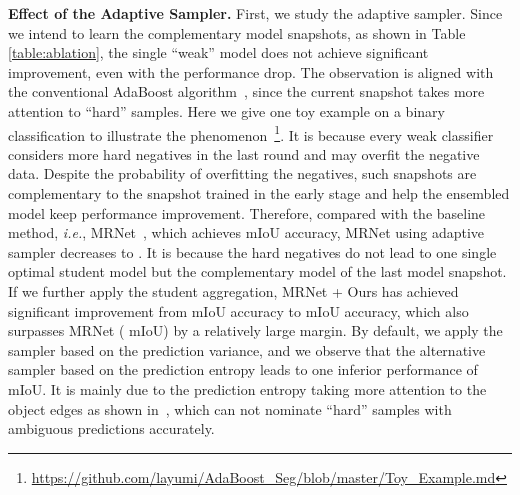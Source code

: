 \documentclass[journal]{IEEEtran}
\def\ie{\emph{i.e.}}
\begin{document}
\noindent\textbf{Effect of the Adaptive Sampler.}
First, we study the adaptive sampler. Since we intend to learn the complementary model snapshots, as shown in Table \ref{table:ablation}, the single ``weak'' model does not achieve significant improvement, even with the performance drop. The observation is aligned with the conventional AdaBoost algorithm~\cite{freund1996experiments}, since the current snapshot takes more attention to ``hard'' samples. Here we give one toy example on a binary classification to illustrate the phenomenon~\footnote{\url{https://github.com/layumi/AdaBoost_Seg/blob/master/Toy_Example.md}}.  It is because every weak classifier considers more hard negatives in the last round and may overfit the negative data. Despite the probability of overfitting the negatives, such snapshots are complementary to the snapshot trained in the early stage and help the ensembled model keep performance improvement. Therefore, compared with the baseline method, \ie, MRNet~\cite{zheng2019unsupervised}, which achieves  mIoU accuracy, MRNet using adaptive sampler decreases to . It is because the hard negatives do not lead to one single optimal student model but the complementary model of the last model snapshot. If we further apply the student aggregation, MRNet + Ours has achieved significant improvement from  mIoU accuracy to  mIoU accuracy, which also surpasses MRNet ( mIoU) by a relatively large margin. By default, we apply the sampler based on the prediction variance, and we observe that the alternative sampler based on the prediction entropy leads to one inferior performance of  mIoU. It is mainly due to the prediction entropy taking more attention to the object edges as shown in~\cite{zheng2020unsupervised}, which can not nominate ``hard'' samples with ambiguous predictions accurately. 
\end{document}
